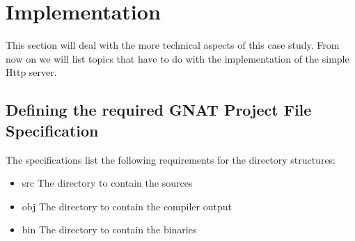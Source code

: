 \section{Implementation}
This section will deal with the more technical aspects of this case study. From
now on we will list topics that have to do with the implementation of the simple
Http server.

\subsection{Defining the required GNAT Project File Specification}
The specifications list the following requirements for the directory structures: 
\begin{itemize}
  \item{src} The directory to contain the sources
  \item{obj} The directory to contain the compiler output
  \item{bin} The directory to contain the binaries
\end{itemize}


